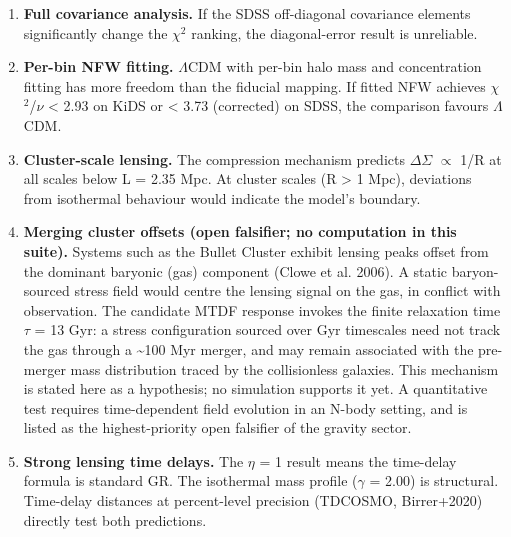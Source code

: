 \documentclass[11pt,a4paper]{article}
\begin{document}
\begin{enumerate}
  \item \textbf{Full covariance analysis.} If the SDSS off-diagonal covariance elements significantly change the $\chi$$^{2}$ ranking, the diagonal-error result is unreliable.
  \item \textbf{Per-bin NFW fitting.} $\Lambda$CDM with per-bin halo mass and concentration fitting has more freedom than the fiducial mapping. If fitted NFW achieves $\chi$$^{2}$/$\nu$ < 2.93 on KiDS or < 3.73 (corrected) on SDSS, the comparison favours $\Lambda$CDM.
  \item \textbf{Cluster-scale lensing.} The compression mechanism predicts $\Delta$$\Sigma$ $\propto$ 1/\allowbreak{}R at all scales below L = 2.35 Mpc. At cluster scales (R > 1 Mpc), deviations from isothermal behaviour would indicate the model's boundary.
  \item \textbf{Merging cluster offsets (open falsifier; no computation in this suite).} Systems such as the Bullet Cluster exhibit lensing peaks offset from the dominant baryonic (gas) component (Clowe et al. 2006). A static baryon-sourced stress field would centre the lensing signal on the gas, in conflict with observation. The candidate MTDF response invokes the finite relaxation time $\tau$ = 13 Gyr: a stress configuration sourced over Gyr timescales need not track the gas through a \~{}100 Myr merger, and may remain associated with the pre-merger mass distribution traced by the collisionless galaxies. This mechanism is stated here as a hypothesis; no simulation supports it yet. A quantitative test requires time-dependent field evolution in an N-body setting, and is listed as the highest-priority open falsifier of the gravity sector.
  \item \textbf{Strong lensing time delays.} The $\eta$ = 1 result means the time-delay formula is standard GR. The isothermal mass profile ($\gamma$ = 2.00) is structural. Time-delay distances at percent-level precision (TDCOSMO, Birrer+2020) directly test both predictions.
\end{enumerate}
\end{document}
